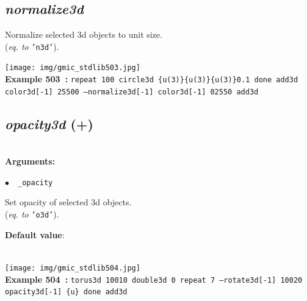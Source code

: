 \documentclass[a4paper,10.5pt,twoside]{book}
\def\comma{\discretionary{,}{}{,}}
\newcommand{\Cb}[1]{\textcolor{cb}{#1}}
\newcommand{\Cc}[1]{\textcolor{cc}{#1}}
\begin{document}
\subsection{\emph{normalize3d} }\vspace*{-0.7em}
Normalize selected 3d objects to unit size.
~\\(\emph{eq. to} {\small \texttt{'n3d'}}).
\begin{center}\texttt{[image: img/gmic\_stdlib503.jpg]}\\
{\footnotesize \textbf{Example 503~:} \texttt{repeat 100 circle3d \{u(3)\}{\comma}\{u(3)\}{\comma}\{u(3)\}{\comma}0.1 done add3d color3d[-1] 255{\comma}0{\comma}0 --normalize3d[-1] color3d[-1] 0{\comma}255{\comma}0 add3d}}
\end{center}

\subsection{\emph{opacity3d} (+)}\vspace*{-0.7em}
~\\\textbf{\Cb{Arguments: }}\begin{flushleft}
{\small \Cb{\hspace*{0.5cm}$\bullet$~~\texttt{\_opacity}}}\end{flushleft}
Set opacity of selected 3d objects.
~\\(\emph{eq. to} {\small \texttt{'o3d'}}).
\begin{flushleft}\Cc{\textbf{Default value}:\\~\\\hspace*{0.5cm}{\small $\bullet$~~\texttt{'opacity=1'.}}}\end{flushleft}
\begin{center}\texttt{[image: img/gmic\_stdlib504.jpg]}\\
{\footnotesize \textbf{Example 504~:} \texttt{torus3d 100{\comma}10 double3d 0 repeat 7 --rotate3d[-1] 1{\comma}0{\comma}0{\comma}20 opacity3d[-1] \{u\} done add3d}}
\end{center}
\end{document}
